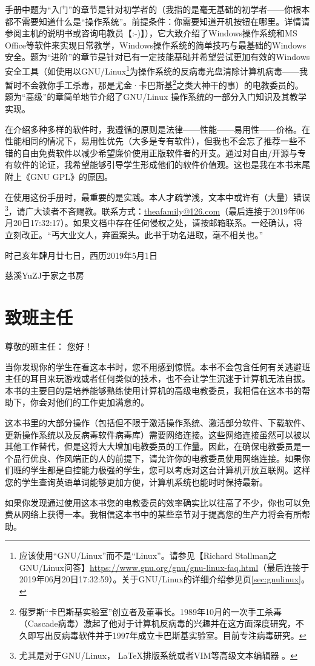 手册中题为“入门”的章节是针对初学者的（我指的是毫无基础的初学者——你根本都不需要知道什么是“操作系统”。前提条件：你需要知道开机按钮在哪里。详情请参阅主机的说明书或咨询电教员【:-)】），它大致介绍了Windows操作系统和MS Office等软件来实现日常教学，Windows操作系统的简单技巧与最基础的Windows安全。题为“进阶”的章节是针对已有一定技能基础并希望尝试更加有效的Windows安全工具（如使用以GNU/Linux\footnote{应该使用“GNU/Linux”而不是“Linux”。请参见【Richard Stallman之GNU/Linux问答】\url{https://www.gnu.org/gnu/gnu-linux-faq.html}（最后连接于2019年06月20日17:32:59）。关于GNU/Linux的详细介绍参见\pageref{sec:gnulinux}页\ref{sec:gnulinux}。}为操作系统的反病毒光盘清除计算机病毒——我暂时不会教你手工杀毒，那是尤金·卡巴斯基\footnote{俄罗斯“卡巴斯基实验室”创立者及董事长。1989年10月的一次手工杀毒（Cascade病毒）激起了他对于计算机反病毒的兴趣并在这方面深度研究，不久即写出反病毒软件并于1997年成立卡巴斯基实验室。目前专注病毒研究。}之类大神干的事）的电教委员的。题为“高级”的章简单地节介绍了GNU/Linux 操作系统的一部分入门知识及其教学实现。\par
在介绍多种多样的软件时，我遵循的原则是法律——性能——易用性——价格。在性能相同的情况下，易用性优先（大多是专有软件），但我也不会忘了推荐一些不错的自由免费软件以减少希望廉价使用正版软件者的开支。通过对自由/开源与专有软件的论证，我希望能够引导学生形成他们的软件价值观。这也是我在本书末尾附上《GNU GPL》的原因。\par
 在使用这份手册时，最重要的是实践。本人才疏学浅，文本中或许有（大量）错误\footnote{尤其是对于GNU/Linux， \LaTeX 排版系统或者VIM等高级文本编辑器 。}，请广大读者不吝赐教。联系方式：\url{theafamily@126.com}（最后连接于2019年06月20日17:32:17）。如果文档中存在任何侵权之处，请按邮箱联系。一经确认，将立刻改正。“丐大业文人，弃置案头。此书于功名进取，毫不相关也。”\par
时己亥年肆月廿七日，西历2019年5月1日\par
慈溪YuZJ于家之书房
\section{致班主任}
\noindent 尊敬的班主任：
您好！\par
当你发现你的学生在看这本书时，您不用感到惊慌。本书不会包含任何有关逃避班主任的耳目来玩游戏或者任何类似的技术，也不会让学生沉迷于计算机无法自拔。本书的主要目的是培养能够熟练使用计算机的高级电教委员，我相信在这本书的帮助下，你会对他们的工作更加满意的。\par
这本书里的大部分操作（包括但不限于激活操作系统、激活部分软件、下载软件、更新操作系统以及反病毒软件病毒库）需要网络连接。这些网络连接虽然可以被以其他工作替代，但是这将大大增加电教委员的工作量。因此，在确保电教委员是一个品行优良、作风端正的人的前提下，请允许你的电教委员使用网络连接。如果你们班的学生都是自控能力极强的学生，您可以考虑对这台计算机开放互联网。这样您的学生查询英语单词能够更加方便，计算机系统也能时时保持最新。\par
如果你发现通过使用这本书您的电教委员的效率确实比以往高了不少，你也可以免费从网络上获得一本。我相信这本书中的某些章节对于提高您的生产力将会有所帮助。
